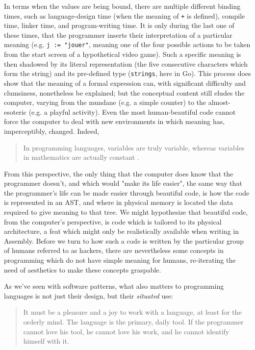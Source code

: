In terms when the values are being bound, there are multiple different binding times, such as language-design time (when the meaning of \lstinline{+} is defined), compile time, linker time, and program-writing time. It is only during the last one of these times, that the programmer inserts their interpretation of a particular meaning (e.g. \lstinline{j := "jouer"}, meaning one of the four possible actions to be taken from the start screen of a hypothetical video game). Such a specific meaning is then shadowed by its literal representation (the five consecutive characters which form the string) and its pre-defined type (\lstinline{strings}, here in Go). This process does show that the meaning of a formal expression can, with significant difficulty and clumsiness, nonetheless be explained; but the conceptual content still eludes the computer, varying from the mundane (e.g. a simple counter) to the almost-esoteric (e.g. a playful activity). Even the most human-beautiful code cannot force the computer to deal with new environments in which meaning has, imperceptibly, changed. Indeed,

\begin{quote}
  In programming languages, variables are truly variable, whereas variables in mathematics are actually constant \citep{wirth_essence_2003}.
\end{quote}

From this perspective, the only thing that the computer does know that the programmer doesn't, and which would "make its life easier", the same way that the programmer's life can be made easier through beautiful code, is how the code is represented in an AST, and where in physical memory is located the data required to give meaning to that tree\citep{stansifer_study_1994}. We might hypothesize that beautiful code, from the computer's perspective, is code which is tailored to its physical architecture, a feat which might only be realistically available when writing in Assembly. Before we turn to how such a code is written by the particular group of humans referred to as hackers, there are nevertheless some concepts in programming which do not have simple meaning for humans, re-iterating the need of aesthetics to make these concepts graspable.

As we've seen with software patterns, what also matters to programming languages is not just their design, but their \emph{situated} use:

\begin{quote}
  It must be a pleasure and a joy to work with a language, at least for the orderly mind. The language is the primary, daily tool. If the programmer cannot love his tool, he cannot love his work, and he cannot identify himself with it. \citep{wirth_essence_2003}
\end{quote}

